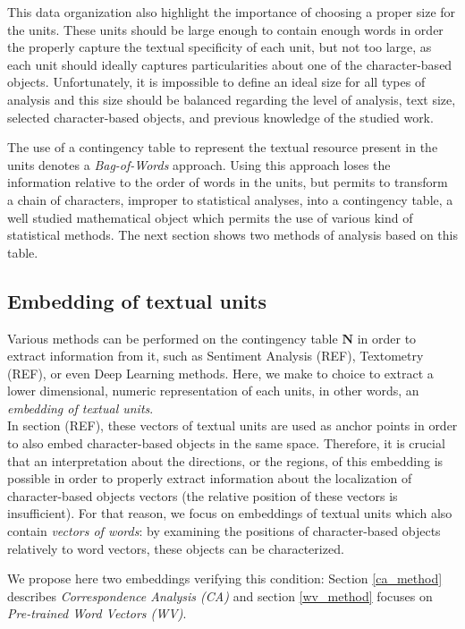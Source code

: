 \documentclass[
twocolumn,
]{ceurart}
\begin{document}
This data organization also highlight the importance of choosing a proper size for the units. These units should be large enough to contain enough words in order the properly capture the textual specificity of each unit, but not too large, as each unit should ideally captures particularities about one of the character-based objects. Unfortunately, it is impossible to define an ideal size for all types of analysis and this size should be balanced regarding the level of analysis, text size, selected character-based objects, and previous knowledge of the studied work.

The use of a contingency table to represent the textual resource present in the units denotes a \emph{Bag-of-Words} approach. Using this approach loses the information relative to the order of words in the units, but permits to transform a chain of characters, improper to statistical analyses, into a contingency table, a well studied mathematical object which permits the use of various kind of statistical methods. The next section shows two methods of analysis based on this table.

\subsection{Embedding of textual units}
\label{unit_embeddings}

Various methods can be performed on the contingency table $\mathbf{N}$ in order to extract information from it, such as Sentiment Analysis (REF), Textometry (REF), or even Deep Learning methods. Here, we make to choice to extract a lower dimensional, numeric representation of each units, in other words, an \emph{embedding of textual units}. \\
In section (REF), these vectors of textual units are used as anchor points in order to also embed character-based objects in the same space. Therefore, it is crucial that an interpretation about the directions, or the regions, of this embedding is possible in order to properly extract information about the localization of character-based objects vectors (the relative position of these vectors is insufficient). For that reason, we focus on embeddings of textual units which also contain \emph{vectors of words}: by examining the positions of character-based objects relatively to word vectors, these objects can be characterized.

We propose here two embeddings verifying this condition: Section \ref{ca_method} describes \emph{Correspondence Analysis (CA)} and section \ref{wv_method} focuses on \emph{Pre-trained Word Vectors (WV)}. 
\end{document}
